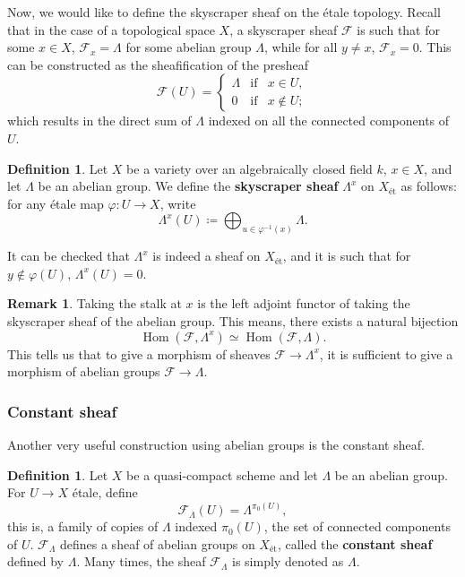 \documentclass{report}
\DeclareMathOperator{\Hom}{Hom}
\theoremstyle{definition}
\newtheorem{definition}[equation]{Definition}
\newtheorem{remark}[equation]{Remark}
\begin{document}
Now, we would like to define the skyscraper sheaf on the \'{e}tale topology. Recall that in the case of a topological space $X$, a skyscraper sheaf $\mathcal{F}$ is such that for some $x\in X$, $\mathcal{F}_x=\Lambda$ for some abelian group $\Lambda$, while for all $y\neq x$, $\mathcal{F}_x=0$. This can be constructed as the sheafification of the presheaf
\[\mathcal{F}(U)=\left\{\begin{array}{rcl}\Lambda&\text{if}&x\in U,\\0&\text{if}&x\notin U;\end{array}\right.\]
which results in the direct sum of $\Lambda$ indexed on all the connected components of $U$.

\begin{definition}
Let $X$ be a variety over an algebraically closed field $k$, $x\in X$, and let $\Lambda$ be an abelian group. We define the \textbf{skyscraper sheaf} $\Lambda^x$ on $X_{\text{\'{e}t}}$ as follows: for any \'{e}tale map $\varphi:U\rightarrow X$, write
\[\Lambda^x(U)\coloneqq\bigoplus_{u\in\varphi^{-1}(x)}\Lambda.\]
\end{definition}

It can be checked that $\Lambda^x$ is indeed a sheaf on $X_{\text{\'{e}t}}$, and it is such that for $y\notin\varphi(U)$, $\Lambda^x(U)=0$.

\begin{remark}
Taking the stalk at $x$ is the left adjoint functor of taking the skyscraper sheaf of the abelian group. This means, there exists a natural bijection
\[\Hom(\mathcal{F},\Lambda^x)\simeq\Hom(\mathcal{F},\Lambda).\]
This tells us that to give a morphism of sheaves $\mathcal{F}\rightarrow\Lambda^x$, it is sufficient to give a morphism of abelian groups $\mathcal{F}\rightarrow\Lambda$.
\end{remark}

\subsubsection*{Constant sheaf}

Another very useful construction using abelian groups is the constant sheaf.

\begin{definition}
Let $X$ be a quasi-compact scheme and let $\Lambda$ be an abelian group. For $U\rightarrow X$ \'{e}tale, define
\[\mathcal{F}_{\Lambda}(U)=\Lambda^{\pi_0(U)},\]
this is, a family of copies of $\Lambda$ indexed $\pi_0(U)$, the set of connected components of $U$. $\mathcal{F}_{\Lambda}$ defines a sheaf of abelian groups on $X_{\text{\'{e}t}}$, called the \textbf{constant sheaf} defined by $\Lambda$. Many times, the sheaf $\mathcal{F}_{\Lambda}$ is simply denoted as $\Lambda$.
\end{definition}
\end{document}
